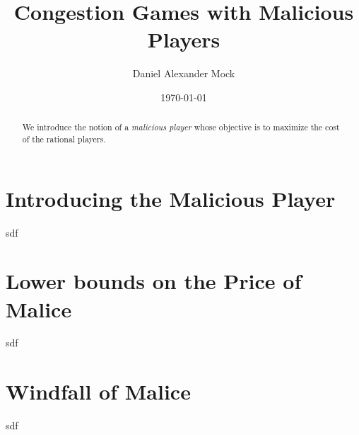 \documentclass[a4paper, titlepage]{tufte-handout}
\title{Congestion Games with Malicious Players}
\author{Daniel Alexander Mock}
\date{\today}
\begin{document}
	\maketitle
	
	\begin{abstract}
		We introduce the notion of a \emph{malicious player} whose objective is to maximize the cost of the rational players.
	\end{abstract}





\section{Introducing the Malicious Player}
sdf
\section{Lower bounds on the Price of Malice}
sdf
\section{Windfall of Malice}
sdf
\end{document}
